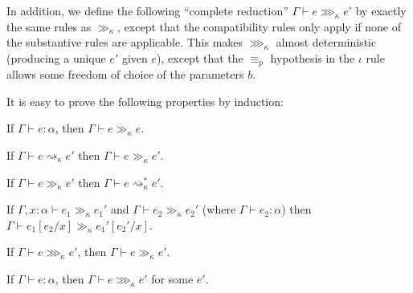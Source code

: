 In addition, we define the following ``complete reduction'' $\Gamma\vdash e\ggg_\kappa e'$ by exactly the same rules as $\gg_\kappa$, except that the compatibility rules only apply if none of the substantive rules are applicable. This makes $\ggg_\kappa$ almost deterministic (producing a unique $e'$ given $e$), except that the $\equiv_p$ hypothesis in the $\iota$ rule allows some freedom of choice of the parameters $b$.

It is easy to prove the following properties by induction:
\begin{lemma}\label{thm:gg_prop}
\begin{thmlist}
\item If $\Gamma\vdash e:\alpha$, then $\Gamma\vdash e\gg_\kappa e$.
\item\label{item:red_gg} If $\Gamma\vdash e\rightsquigarrow_\kappa e'$ then $\Gamma\vdash e\gg_\kappa e'$.
\item\label{item:gg_red} If $\Gamma\vdash e\gg_\kappa e'$ then $\Gamma\vdash e\rightsquigarrow_\kappa^* e'$.
\item\label{item:gg_subst} If $\Gamma,x:\alpha\vdash e_1\gg_\kappa e_1'$ and $\Gamma\vdash e_2\gg_\kappa e_2'$ (where $\Gamma\vdash e_2:\alpha$) then\\ $\Gamma\vdash e_1[e_2/x]\gg_\kappa e_1'[e_2'/x]$.
\item\label{item:ggg_gg} If $\Gamma\vdash e\ggg_\kappa e'$, then $\Gamma\vdash e\gg_\kappa e'$.
\item\label{item:ggg_ex} If $\Gamma\vdash e:\alpha$, then $\Gamma\vdash e\ggg_\kappa e'$ for some $e'$.
\end{thmlist}
\end{lemma}

